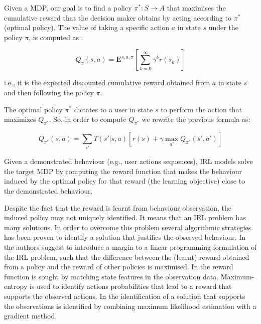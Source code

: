 Given a MDP, our goal is to find a policy $\pi^* : S \rightarrow A$ that maximises the cumulative reward that the decision maker obtains by acting according to $\pi^*$ (optimal policy). 
The value of taking a specific action $a$ in state $s$ under the policy $\pi$, is computed as :

$$Q_{\pi}(s,a)=\mathbf{E}^{s,a,\pi}[\sum_{k=0}^{\infty} \gamma^k r(s_k)]$$

i.e., it is the expected discounted cumulative reward obtained from $a$ in state $s$ and then following the policy $\pi$.


The optimal policy $\pi^*$ dictates to a user in state $s$ to perform the action that maximizes $Q_{\pi^*}$. So, in order to compute $Q_{\pi^*}$ we rewrite the previous formula as:

$$Q_{\pi^*}(s,a) = \sum_{s'}T(s'|s,a)\left[r(s)+\gamma \max_{a'}{Q_{\pi^*}(s',a')}\right]$$



Given a demonstrated behaviour (e.g., user actions sequences), IRL models solve the target MDP by computing the reward function that makes the behaviour induced by the optimal policy for that reward (the learning objective) close to the demonstrated behaviour.

Despite the fact that the reward is learnt from behaviour observation, the induced policy may not uniquely identified. It means that an IRL problem has many solutions. In order to overcome this problem several algorithmic strategies has been proven to identify a solution that justifies the observed behaviour. In \cite{ng:2000} the authors suggest to introduce a margin to a linear programming formulation of the IRL problem, such that the difference between the (learnt) reward obtained from a policy and the reward of other policies is maximised. In \cite{maxentirl} the reward function is sought by matching state features in the observation data. Maximum-entropy is used to identify actions probabilities that lead to a reward that supports the observed actions.
In \cite{vro:litt:2011} the identification of a solution that supports the observations is identified by combining maximum likelihood estimation with a gradient method.

